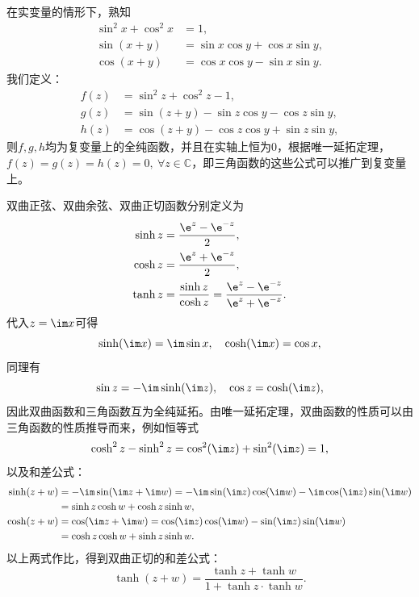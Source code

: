\begin{example}[三角函数]
    在实变量的情形下，熟知
    \begin{align}
        \sin^2 x+\cos^2 x&=1,\\
        \sin(x+y)&=\sin x\cos y+\cos x\sin y,\\
        \cos(x+y)&=\cos x\cos y-\sin x\sin y.
    \end{align}
    我们定义：
    \begin{align}
        f(z)&=\sin^2 z+\cos^2 z-1,\\
        g(z)&=\sin(z+y)-\sin z\cos y-\cos z\sin y,\\
        h(z)&=\cos(z+y)-\cos z\cos y+\sin z\sin y,
    \end{align}
    则$f,g,h$均为复变量上的全纯函数，并且在实轴上恒为$0$，根据唯一延拓定理，$f(z)=g(z)=h(z)=0,\ \forall z\in\mathbb{C}$，即三角函数的这些公式可以推广到复变量上。
\end{example}
\begin{example}[双曲函数]
    双曲正弦、双曲余弦、双曲正切函数分别定义为
    \begin{align}
        \sinh z&=\frac{\e^z-\e^{-z}}{2},\\
        \cosh z&=\frac{\e^z+\e^{-z}}{2},\\
        \tanh z&=\frac{\sinh z}{\cosh z}=\frac{\e^z-\e^{-z}}{\e^z+\e^{-z}}.
    \end{align}
    代入$z=\im x$可得
    \begin{equation}
        \sinh(\im x)=\im\sin x,\quad \cosh(\im x)=\cos x,
    \end{equation}
    同理有
    \begin{equation}
        \sin z=-\im\sinh(\im z),\quad \cos z=\cosh(\im z),
    \end{equation}
    因此双曲函数和三角函数互为全纯延拓。由唯一延拓定理，双曲函数的性质可以由三角函数的性质推导而来，例如恒等式
    \begin{equation}
        \cosh^2 z-\sinh^2 z=\cos^2(\im z)+\sin^2(\im z)=1,
    \end{equation}
    以及和差公式：
    \begin{align}
        \sinh(z+w)&=-\im\sin(\im z+\im w)=-\im\sin(\im z)\cos(\im w)-\im\cos(\im z)\sin(\im w)\nonumber\\
        &=\sinh z\cosh w+\cosh z\sinh w,\\
        \cosh(z+w)&=\cos(\im z+\im w)=\cos(\im z)\cos(\im w)-\sin(\im z)\sin(\im w)\nonumber\\
        &=\cosh z\cosh w+\sinh z\sinh w.
    \end{align}
    以上两式作比，得到双曲正切的和差公式：
    \begin{equation}
        \tanh(z+w)=\frac{\tanh z+\tanh w}{1+\tanh z\cdot\tanh w}.
    \end{equation}
\end{example}
